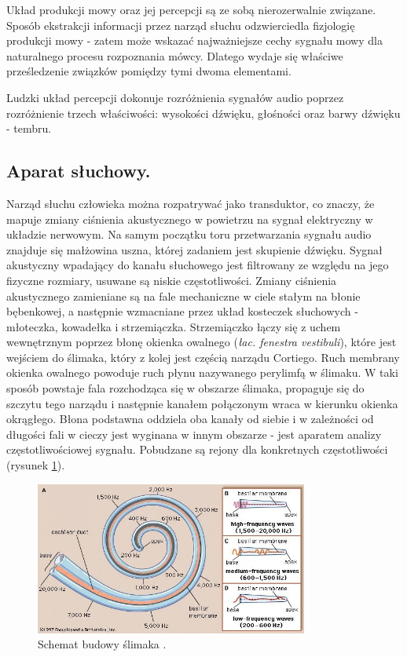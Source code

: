 Układ produkcji mowy oraz jej percepcji są ze sobą nierozerwalnie związane. Sposób ekstrakcji informacji przez narząd słuchu odzwierciedla fizjologię produkcji mowy - zatem może wskazać najważniejsze cechy sygnału mowy dla naturalnego procesu rozpoznania mówcy. Dlatego wydaje się właściwe prześledzenie związków pomiędzy tymi dwoma elementami.

Ludzki układ percepcji dokonuje rozróżnienia sygnałów audio poprzez rozróżnienie trzech właściwości: wysokości dźwięku, głośności oraz barwy dźwięku - tembru. 

\subsection{Aparat słuchowy.}
Narząd słuchu człowieka można rozpatrywać jako transduktor, co znaczy, że mapuje zmiany ciśnienia akustycznego w powietrzu na sygnał elektryczny w układzie nerwowym. Na samym początku toru przetwarzania sygnału audio znajduje się małżowina uszna, której zadaniem jest skupienie dźwięku. Sygnał akustyczny wpadający do kanału słuchowego jest filtrowany ze względu na jego fizyczne rozmiary, usuwane są niskie częstotliwości. Zmiany ciśnienia akustycznego zamieniane są na fale mechaniczne w ciele stałym na błonie bębenkowej, a następnie wzmacniane przez układ kosteczek słuchowych - młoteczka, kowadełka i strzemiączka. Strzemiączko łączy się z uchem wewnętrznym poprzez błonę okienka owalnego (\textit{łac. fenestra vestibuli}), które jest wejściem do ślimaka, który z kolej jest częścią narządu Cortiego. Ruch membrany okienka owalnego powoduje ruch płynu nazywanego perylimfą w ślimaku. W taki sposób powstaje fala rozchodząca się w obszarze ślimaka, propaguje się do szczytu tego narządu i następnie kanałem połączonym wraca w kierunku okienka okrągłego. Błona podstawna oddziela oba kanały od siebie i w zależności od długości fali w cieczy jest wyginana w innym obszarze - jest aparatem analizy częstotliwościowej sygnału. Pobudzane są rejony dla konkretnych częstotliwości (rysunek \ref{fig:ucho}).
\begin{figure}[ht!]
  \centering
    \includegraphics[width=0.8\textwidth]{./ucho.jpg}
    \caption{\label{fig:ucho} Schemat budowy ślimaka \cite{enciclopidiabritanica}.}
\end{figure}
